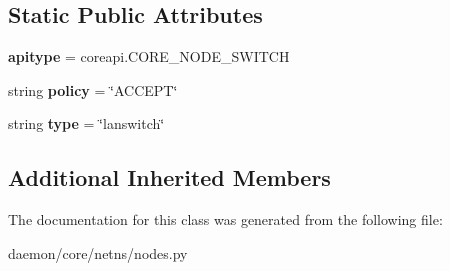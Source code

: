 \subsection*{Static Public Attributes}
\begin{DoxyCompactItemize}
\item 
\hypertarget{classcore_1_1netns_1_1nodes_1_1_switch_node_a496112a564951110c46d29788b27cee3}{{\bfseries apitype} = coreapi.\+C\+O\+R\+E\+\_\+\+N\+O\+D\+E\+\_\+\+S\+W\+I\+T\+C\+H}\label{classcore_1_1netns_1_1nodes_1_1_switch_node_a496112a564951110c46d29788b27cee3}

\item 
\hypertarget{classcore_1_1netns_1_1nodes_1_1_switch_node_a24f565c294695b56030c612cf89298d8}{string {\bfseries policy} = \char`\"{}A\+C\+C\+E\+P\+T\char`\"{}}\label{classcore_1_1netns_1_1nodes_1_1_switch_node_a24f565c294695b56030c612cf89298d8}

\item 
\hypertarget{classcore_1_1netns_1_1nodes_1_1_switch_node_a7efe2622ae7d56c1b3059e72cf797ec3}{string {\bfseries type} = \char`\"{}lanswitch\char`\"{}}\label{classcore_1_1netns_1_1nodes_1_1_switch_node_a7efe2622ae7d56c1b3059e72cf797ec3}

\end{DoxyCompactItemize}
\subsection*{Additional Inherited Members}


The documentation for this class was generated from the following file\+:\begin{DoxyCompactItemize}
\item 
daemon/core/netns/nodes.\+py\end{DoxyCompactItemize}
